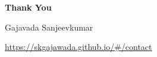 \documentclass[aspectratio=169,10pt]{beamer}
\begin{document}

\begin{frame}[plain]

    \centering

    \vspace*{0.20\textheight}

    {\fontsize{32}{38}\selectfont\bfseries Thank You\par}

    \vspace{0.9cm}

    {\fontsize{18}{22}\selectfont Gajavada Sanjeevkumar\par}

    \vspace{0.45cm}

    {\fontsize{14}{18}\selectfont
    \href{https://skgajawada.github.io/\#/contact}
    {https://skgajawada.github.io/\#/contact}\par}

\end{frame}
\end{document}
